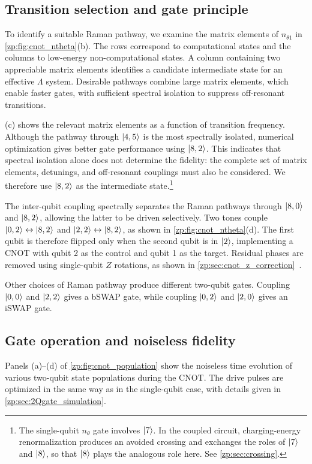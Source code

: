 \subsection{Transition selection and gate principle}\label{zp:sec_sub:cnot_transition}

To identify a suitable Raman pathway, we examine the matrix elements of $n_{\theta 1}$ in \cref{zp:fig:cnot_ntheta}(b).
The rows correspond to computational states and the columns to low-energy non-computational states.
A column containing two appreciable matrix elements identifies a candidate intermediate state for an effective $\Lambda$ system.
Desirable pathways combine large matrix elements, which enable faster gates, with sufficient spectral isolation to suppress off-resonant transitions.

(c) shows the relevant matrix elements as a function of transition frequency.
Although the pathway through $\ket{4,5}$ is the most spectrally isolated, numerical optimization gives better gate performance using $\ket{8,2}$.
This indicates that spectral isolation alone does not determine the fidelity: the complete set of matrix elements, detunings, and off-resonant couplings must also be considered.
We therefore use $\ket{8,2}$ as the intermediate state.\footnote{The single-qubit $n_\theta$ gate involves $\ket{7}$.
In the coupled circuit, charging-energy renormalization produces an avoided crossing and exchanges the roles of $\ket{7}$ and $\ket{8}$, so that $\ket{8}$ plays the analogous role here.
See \cref{zp:sec:crossing}.}

The inter-qubit coupling spectrally separates the Raman pathways through $\ket{8,0}$ and $\ket{8,2}$, allowing the latter to be driven selectively.
Two tones couple $\ket{0,2}\leftrightarrow\ket{8,2}$ and $\ket{2,2}\leftrightarrow\ket{8,2}$, as shown in \cref{zp:fig:cnot_ntheta}(d).
The first qubit is therefore flipped only when the second qubit is in $\ket{2}$, implementing a CNOT with qubit 2 as the control and qubit 1 as the target.
Residual phases are removed using single-qubit $Z$ rotations, as shown in \cref{zp:sec:cnot_z_correction}~\cite{nesterov2022cnot}.

Other choices of Raman pathway produce different two-qubit gates.
Coupling $\ket{0,0}$ and $\ket{2,2}$ gives a bSWAP gate, while coupling $\ket{0,2}$ and $\ket{2,0}$ gives an iSWAP gate.

\subsection{Gate operation and noiseless fidelity}\label{zp:sec_sub:cnot_fidelity}
Panels (a)--(d) of \cref{zp:fig:cnot_population} show the noiseless time evolution of various two-qubit state populations during the CNOT.
The drive pulses are optimized in the same way as in the single-qubit case, with details given in \cref{zp:sec:2Qgate_simulation}.

